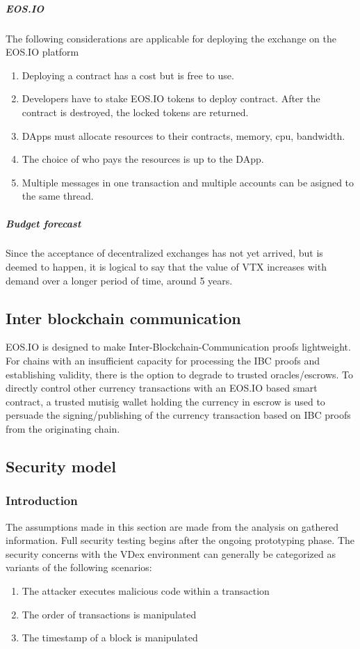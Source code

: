 \documentclass[]{article}
\begin{document}
{\subparagraph{EOS.IO}
The following considerations are applicable for deploying the exchange on the EOS.IO platform
\begin{enumerate}
\item Deploying a contract has a cost but is free to use. 
\item Developers have to stake EOS.IO tokens to deploy contract.
After the contract is destroyed, the locked tokens are returned.
\item DApps must allocate resources to their contracts, memory, cpu, bandwidth. 
\item The choice of who pays the resources is up to the DApp.
\item Multiple messages in one transaction and multiple accounts can be asigned to the same thread.

\end{enumerate}

\subparagraph{Budget forecast}
Since the acceptance of decentralized exchanges has not yet arrived, but is deemed to happen, 
it is logical to say that the value of VTX increases with demand over a longer period of time, around 5 years.

\subsection{Inter blockchain communication}
EOS.IO is designed to make Inter-Blockchain-Communication proofs lightweight. 
For chains with an insufficient capacity for processing the  IBC proofs and establishing validity, 
there is the option to degrade to trusted oracles/escrows.
To directly control other currency transactions with an
EOS.IO based smart contract, a trusted mutisig wallet holding the currency 
in escrow is used to persuade the signing/publishing of the currency 
transaction based on IBC proofs from the originating chain.	
\subsection{Security model}
\subsubsection{Introduction}
The assumptions made in this section are made from the analysis on gathered information. 
Full security testing begins after the ongoing prototyping phase. 
The security concerns with the VDex environment can generally be categorized as variants of the following scenarios:
	\begin{enumerate}
		\item The attacker executes malicious code within a transaction
		\item The order of transactions is manipulated
		\item The timestamp of a block is manipulated
	\end{enumerate}
}
\end{document}
